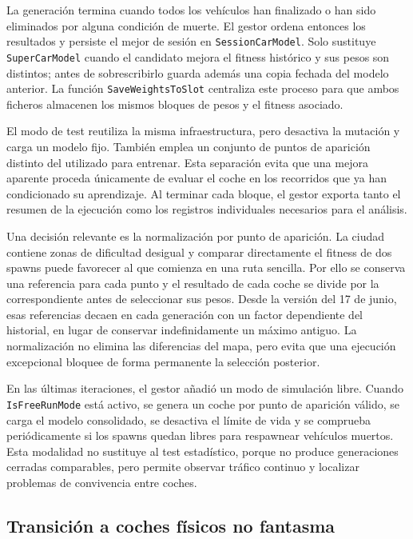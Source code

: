 La generación termina cuando todos los vehículos han finalizado o han sido eliminados por alguna condición de muerte. El gestor ordena entonces los resultados y persiste el mejor de sesión en \texttt{SessionCarModel}. Solo sustituye \texttt{SuperCarModel} cuando el candidato mejora el fitness histórico y sus pesos son distintos; antes de sobrescribirlo guarda además una copia fechada del modelo anterior. La función \texttt{SaveWeightsToSlot} centraliza este proceso para que ambos ficheros almacenen los mismos bloques de pesos y el fitness asociado.

El modo de test reutiliza la misma infraestructura, pero desactiva la mutación y carga un modelo fijo. También emplea un conjunto de puntos de aparición distinto del utilizado para entrenar. Esta separación evita que una mejora aparente proceda únicamente de evaluar el coche en los recorridos que ya han condicionado su aprendizaje. Al terminar cada bloque, el gestor exporta tanto el resumen de la ejecución como los registros individuales necesarios para el análisis.

Una decisión relevante es la normalización por punto de aparición. La ciudad contiene zonas de dificultad desigual y comparar directamente el fitness de dos spawns puede favorecer al que comienza en una ruta sencilla. Por ello se conserva una referencia para cada punto y el resultado de cada coche se divide por la correspondiente antes de seleccionar sus pesos. Desde la versión del 17 de junio, esas referencias decaen en cada generación con un factor dependiente del historial, en lugar de conservar indefinidamente un máximo antiguo. La normalización no elimina las diferencias del mapa, pero evita que una ejecución excepcional bloquee de forma permanente la selección posterior.

En las últimas iteraciones, el gestor añadió un modo de simulación libre. Cuando \texttt{IsFreeRunMode} está activo, se genera un coche por punto de aparición válido, se carga el modelo consolidado, se desactiva el límite de vida y se comprueba periódicamente si los spawns quedan libres para respawnear vehículos muertos. Esta modalidad no sustituye al test estadístico, porque no produce generaciones cerradas comparables, pero permite observar tráfico continuo y localizar problemas de convivencia entre coches.

\subsection{Transición a coches físicos no fantasma}

